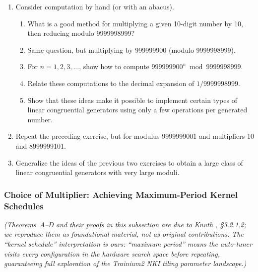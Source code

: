 \documentclass[12pt]{article}
\begin{document}
\begin{enumerate}
\item[\textbf{12.}] [$M28$] Consider computation by hand (or with an abacus).

\begin{enumerate}
\item[a)] What is a good method for multiplying a given 10-digit number by 10, then reducing modulo 9999998999?
\item[b)] Same question, but multiplying by 999999900 (modulo 9999998999).
\item[c)] For $n = 1, 2, 3, \ldots$, show how to compute $999999900^n \bmod 9999998999$.
\item[d)] Relate these computations to the decimal expansion of $1/9999998999$.
\item[e)] Show that these ideas make it possible to implement certain types of linear congruential generators using only a few operations per generated number.
\end{enumerate}

\item[\textbf{13.}] [$M24$] Repeat the preceding exercise, but for modulus 9999999001 and multipliers 10 and 8999999101.

\item[\textbf{14.}] [$M25$] Generalize the ideas of the previous two exercises to obtain a large class of linear congruential generators with very large moduli.
\end{enumerate}


\subsubsection{Choice of Multiplier: Achieving Maximum-Period Kernel Schedules}
\label{sec:3.2.1.2}

\noindent\textit{(Theorems~A--D and their proofs in this subsection are due to Knuth \citep{knuth1997taocp2}, \S3.2.1.2; we reproduce them as foundational material, not as original contributions. The ``kernel schedule'' interpretation is ours: ``maximum period'' means the auto-tuner visits every configuration in the hardware search space before repeating, guaranteeing full exploration of the Trainium2 NKI tiling parameter landscape.)}
\end{document}

